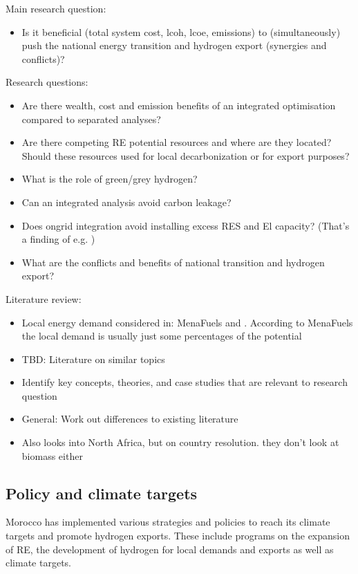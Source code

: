 Main research question:
\begin{itemize}
    \item Is it beneficial (total system cost, lcoh, lcoe, emissions) to (simultaneously) push the national energy transition and hydrogen export (synergies and conflicts)?   
\end{itemize}

Research questions:
\begin{itemize}
    \item Are there wealth, cost and emission benefits of an integrated optimisation compared to separated analyses?
    \item Are there competing RE potential resources and where are they located? Should these resources used for local decarbonization or for export purposes?
    \item What is the role of green/grey hydrogen?   
    \item Can an integrated analysis avoid carbon leakage?
    \item Does ongrid integration avoid installing excess RES and El capacity? (That's a finding of e.g. \cite{Ruhnau2022})
    \item What are the conflicts and benefits of national transition and hydrogen export?
\end{itemize}

Literature review:
\begin{itemize}
    \item Local energy demand considered in: MenaFuels and \cite{Hampp2021}. According to MenaFuels the local demand is usually just some percentages of the potential
    \item TBD: Literature on similar topics 
    \item Identify key concepts, theories, and case studies that are relevant to research question
    \item General: Work out differences to existing literature
    \item \cite{Zwaan2021} Also looks into North Africa, but on country resolution. they don't look at biomass either
\end{itemize}


\subsection{Policy and climate targets}
\label{subsec:policyandtargets}
Morocco has implemented various strategies and policies to reach its climate targets and promote hydrogen exports. 
These include programs on the expansion of RE, the development of hydrogen for local demands and exports as well as climate targets.

